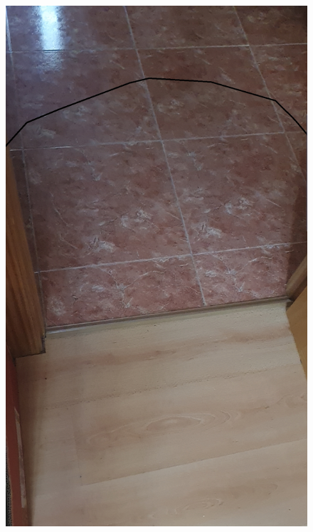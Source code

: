\begin{figure}[H]
\centering
    \hspace{-4mm}
    \begin{minipage}{0.5\textwidth}
        \centering
        \includegraphics[scale=0.12]{Images/Shaders/oclusion (1).jpg}\\
    \end{minipage}
    \begin{minipage}{0.5\textwidth}
        \centering

\end{minipage}
\end{figure}
